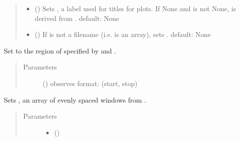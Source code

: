 \documentclass[letterpaper,10pt,openany,oneside,english]{sphinxmanual}
\begin{document}
\begin{fulllineitems}
\begin{quote}
\begin{description}
\begin{itemize}
\item {} 
 (\sphinxstyleliteralemphasis{, }) \textendash{} Sets , a label used for titles for plots. If None and
 is not None,  is derived from .
default: None

\item {} 
 (\sphinxstyleliteralemphasis{, }) \textendash{} If  is not a filename (i.e. is an array), sets .
default: None

\end{itemize}

\end{description}\end{quote}

\begin{fulllineitems}
\label{\detokenize{signals:signals.BaseTrajectory.crop}}
Set  to the region of  specified by  and
.
\begin{quote}\begin{description}
\item[{Parameters}] \leavevmode
{} () \textendash{} observes 
format: (start, stop)

\end{description}\end{quote}

\end{fulllineitems}


\begin{fulllineitems}
\label{\detokenize{signals:signals.BaseTrajectory.slice}}
Sets , an array of evenly spaced windows from .
\begin{quote}\begin{description}
\item[{Parameters}] \leavevmode\begin{itemize}
\item {} 
 () \textendash{} 


\end{itemize}
\end{description}
\end{quote}
\end{fulllineitems}
\end{fulllineitems}
\end{document}

